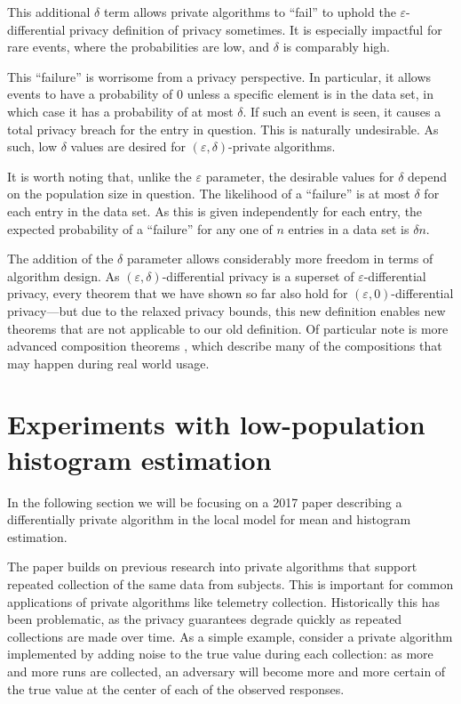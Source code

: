 \documentclass[a4paper,12pt]{article}
\renewcommand{\epsilon}{\varepsilon}
\begin{document}
This additional $\delta$ term allows private algorithms to ``fail'' to uphold the $\epsilon$-differential privacy definition of privacy sometimes. It is especially impactful for rare events, where the probabilities are low, and $\delta$ is comparably high.

This ``failure'' is worrisome from a privacy perspective. In particular, it allows events to have a probability of 0 unless a specific element is in the data set, in which case it has a probability of at most $\delta$. If such an event is seen, it causes a total privacy breach for the entry in question. This is naturally undesirable. As such, low $\delta$ values are desired for $(\epsilon,\delta)$-private algorithms.

It is worth noting that, unlike the $\epsilon$ parameter, the desirable values for $\delta$ depend on the population size in question. The likelihood of a ``failure'' is at most $\delta$ for each entry in the data set. As this is given independently for each entry, the expected probability of a ``failure'' for any one of $n$ entries in a data set is $\delta n$.

The addition of the $\delta$ parameter allows considerably more freedom in terms of algorithm design. As $(\epsilon,\delta)$-differential privacy is a superset of $\epsilon$-differential privacy, every theorem that we have shown so far also hold for $(\epsilon,0)$-differential privacy---but due to the relaxed privacy bounds, this new definition enables new theorems that are not applicable to our old definition. Of particular note is more advanced composition theorems \cite[Sec.~3.5.2]{dwork_privacybook}, which describe many of the compositions that may happen during real world usage.

\newpage
\section{Experiments with low-population histogram estimation \label{sec:telemetry}}

In the following section we will be focusing on a 2017 paper \cite{microsoft_telemetry} describing a differentially private algorithm in the local model for mean and histogram estimation.

The paper builds on previous research \cite{google_rappor} into private algorithms that support repeated collection of the same data from subjects. This is important for common applications of private algorithms like telemetry collection. Historically this has been problematic, as the privacy guarantees degrade quickly as repeated collections are made over time. As a simple example, consider a private algorithm implemented by adding noise to the true value during each collection: as more and more runs are collected, an adversary will become more and more certain of the true value at the center of each of the observed responses.
\end{document}
